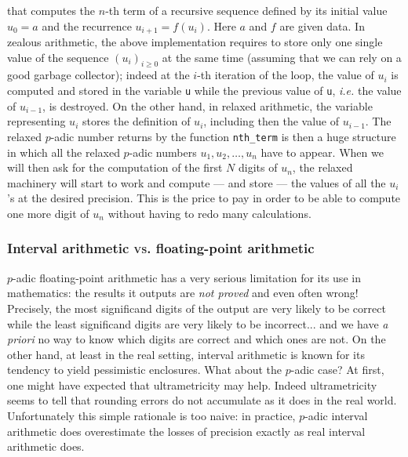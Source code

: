 \documentclass[11pt]{article}
\numberwithin{equation}{section}
\numberwithin{figure}{section}
\renewcommand{\geq}{\geqslant}
\theoremstyle{definition}
\begin{document}
\noindent
that computes the $n$-th term of a recursive sequence defined by its 
initial value $u_0 = a$ and the recurrence $u_{i+1} = f(u_i)$. Here $a$ 
and $f$ are given data.
In zealous arithmetic, the above implementation requires to store only 
one single value of the sequence $(u_i)_{i \geq 0}$ at the same time 
(assuming that we can rely on a good garbage collector); indeed at the 
$i$-th iteration of the loop, the value of $u_i$ is computed and stored 
in the variable \texttt{u} while the previous value of \texttt{u}, 
\emph{i.e.} the value of $u_{i-1}$, is destroyed.
On the other hand, in relaxed arithmetic, the variable representing 
$u_i$ stores the definition of $u_i$, including then the value of 
$u_{i-1}$. The relaxed $p$-adic number returns by the function 
\texttt{nth\_term} is then a huge structure in which all the relaxed 
$p$-adic numbers $u_1, u_2, \ldots, u_n$ have to appear. When we will
then ask for the computation of the first $N$ digits of $u_n$, the
relaxed machinery will start to work and compute --- and store --- 
the values of all the $u_i$'s at the desired precision. This is the price 
to pay in order to be able to compute one more digit of $u_n$ without 
having to redo many calculations.

\subsubsection{Interval arithmetic \textsc{vs.} floating-point arithmetic}
\label{sssec:intervalVSfloat}

$p$-adic floating-point arithmetic has a very serious limitation for 
its use in mathematics: the results it outputs are \emph{not proved} 
and even often wrong! Precisely, the most significand digits of the 
output are very likely to be correct while the least significand digits are 
very likely to be incorrect... and we have \emph{a priori} no way to know 
which digits are correct and which ones are not.
On the other hand, at least in the real setting, interval arithmetic 
is known for its tendency to yield pessimistic enclosures. 
What about the $p$-adic 
case? At first, one might have expected that ultrametricity may help. 
Indeed ultrametricity seems to tell that rounding errors do not 
accumulate as it does in the real world. Unfortunately this simple 
rationale is too naive: in practice, $p$-adic interval arithmetic
does overestimate the losses of precision exactly as real interval
arithmetic does.
\end{document}
